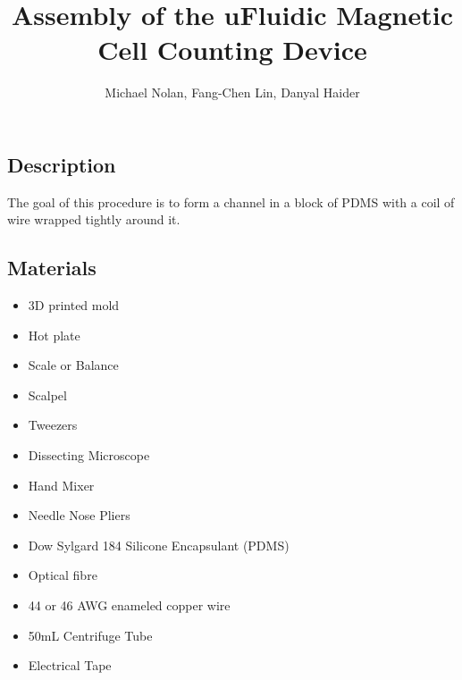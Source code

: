 \documentclass[10pt, journal]{IEEEtran}
\title{Assembly of the uFluidic Magnetic Cell Counting Device}
\author{Michael Nolan, Fang-Chen Lin, Danyal Haider}
\begin{document}
\maketitle \par
\subsection{Description}
The goal of this procedure is to form a channel in a block of PDMS
with a coil of wire wrapped tightly around it.
\subsection{Materials}
\begin{itemize}
\item 3D printed mold
\item Hot plate
\item Scale or Balance
\item Scalpel
\item Tweezers
\item Dissecting Microscope
\item Hand Mixer
\item Needle Nose Pliers

\item Dow Sylgard 184 Silicone Encapsulant (PDMS)
\item Optical fibre
\item 44 or 46 AWG enameled copper wire
\item 50mL Centrifuge Tube
\item Electrical Tape
  
\end{itemize}
\end{document}
